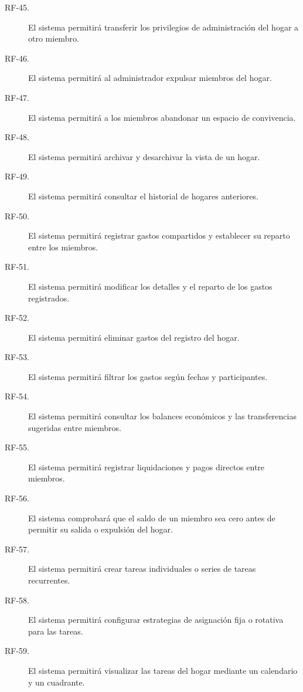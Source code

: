 \begin{description}
    \item[RF-45.] El sistema permitirá transferir los privilegios de administración del hogar a otro miembro.

    \item[RF-46.] El sistema permitirá al administrador expulsar miembros del hogar.

    \item[RF-47.] El sistema permitirá a los miembros abandonar un espacio de convivencia.

    \item[RF-48.] El sistema permitirá archivar y desarchivar la vista de un hogar.

    \item[RF-49.] El sistema permitirá consultar el historial de hogares anteriores.

    \item[RF-50.] El sistema permitirá registrar gastos compartidos y establecer su reparto entre los miembros.

    \item[RF-51.] El sistema permitirá modificar los detalles y el reparto de los gastos registrados.

    \item[RF-52.] El sistema permitirá eliminar gastos del registro del hogar.

    \item[RF-53.] El sistema permitirá filtrar los gastos según fechas y participantes.

    \item[RF-54.] El sistema permitirá consultar los balances económicos y las transferencias sugeridas entre miembros.

    \item[RF-55.] El sistema permitirá registrar liquidaciones y pagos directos entre miembros.

    \item[RF-56.] El sistema comprobará que el saldo de un miembro sea cero antes de permitir su salida o expulsión del hogar.

    \item[RF-57.] El sistema permitirá crear tareas individuales o series de tareas recurrentes.

    \item[RF-58.] El sistema permitirá configurar estrategias de asignación fija o rotativa para las tareas.

    \item[RF-59.] El sistema permitirá visualizar las tareas del hogar mediante un calendario y un cuadrante.


\end{description}
